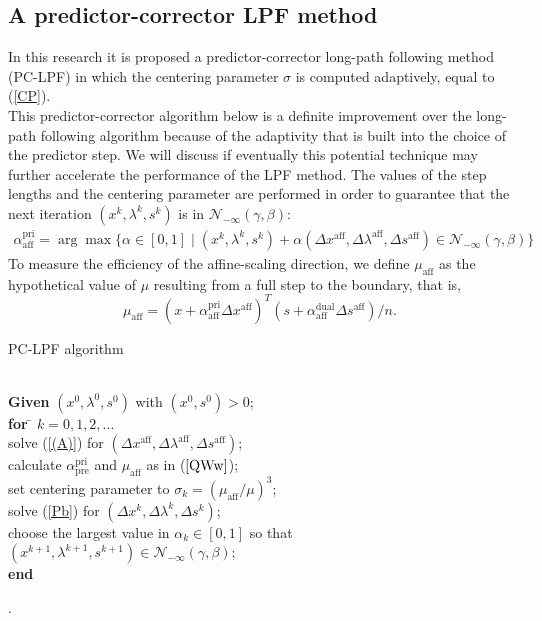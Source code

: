 \documentclass[a4paper,10 pt,titlepage,twoside]{book}
\theoremstyle{plain}
\theoremstyle{definition}
\theoremstyle{remark}
\begin{document}
\subsection{A predictor-corrector LPF method}
In this research it is proposed a predictor-corrector long-path following method (PC-LPF) in which the centering parameter $\sigma$ is computed adaptively, equal to (\ref{CP}).\\
This predictor-corrector algorithm below is a definite improvement over the long-path following algorithm because of the adaptivity that is built into the choice of the predictor step. We will discuss if eventually this potential
technique may further accelerate the performance of the LPF method.
The values of the step lengths and the centering parameter are performed in order to guarantee that the next iteration $(x^{k}, \lambda^{k}, s^{k})$ is in $\mathcal{N}_{-\infty}(\gamma,\beta)$:
\begin{align}\label{QWw}
\alpha_{\text{aff}}^{\text{pri}}=\arg\max\{\alpha\in[0,1]\;|\;(x^{k}, \lambda^{k}, s^{k})+ \alpha(\Delta x^{\text{aff}}, \Delta\lambda^{\text{aff}}, \Delta s^{\text{aff}})\in\mathcal{N}_{-\infty}(\gamma,\beta)\}
\end{align}
To measure the efficiency of the affine-scaling direction, we define $\mu_{\text{aff}}$ as the hypothetical value of $\mu$ resulting from a full step to the boundary, that is,
\begin{equation*}
\mu_{\text{aff}}= (x+\alpha_{\text{aff}}^{\text{pri}}\Delta x^{\text{aff}})^{T}(s+\alpha_{\text{aff}}^{\text{dual}}\Delta s^{\text{aff}})/n.
\end{equation*}
\begin{algorithm}\caption{\label{alg:pc}PC-LPF algorithm}
\begin{tabbing}
	\\
	\textbf{Given} $(x^{0}, \lambda^{0}, s^{0})$ with $(x^{0}, s^{0})> 0$; \\
	\textbf{for} \= $k = 0, 1, 2,...$ \\
	\> solve (\ref{(A)}) for $(\Delta x^{\text{aff}},\Delta \lambda^{\text{aff}},\Delta s^{\text{aff}})$;\\
	\> calculate $\alpha_{\text{pre}}^{\text{pri}}$ and $\mu_{\text{aff}}$ as in ($\ref{QWw}$);\\
	\> set centering parameter to $\sigma_{k} = (\mu_{\text{aff}}/\mu)^{3}$; \\
	\> solve (\ref{Pb}) for $(\Delta x^{k},\Delta \lambda^{k},\Delta s^{k})$;\\
	\> choose the largest value in $\alpha_{k}\in[0,1]$ so that $(x^{k+1}, \lambda^{k+1}, s^{k+1})\in\mathcal{N}_{-\infty}(\gamma,\beta)$;\\
	\textbf{end}
\end{tabbing}
\end{algorithm}
.
\end{document}
